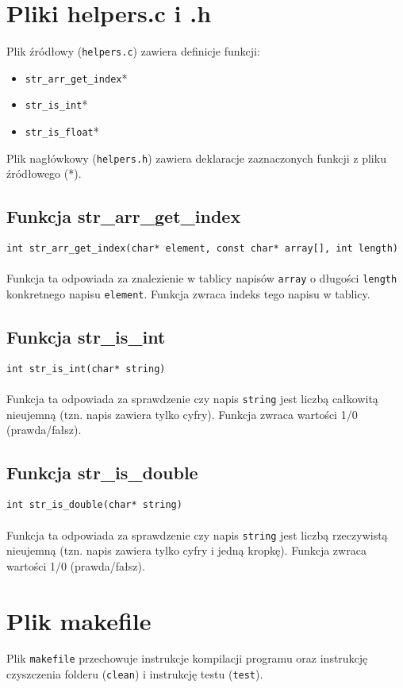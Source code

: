 \documentclass[11pt,a4paper]{report}
\begin{document}
    \section{Pliki helpers.c i .h}
    Plik źródłowy (\verb|helpers.c|) zawiera definicje funkcji:
    \begin{itemize}
        \item \verb|str_arr_get_index|*
        \item \verb|str_is_int|*
        \item \verb|str_is_float|*
    \end{itemize}
    Plik nagłówkowy (\verb|helpers.h|) zawiera deklaracje zaznaczonych funkcji z pliku źródłowego (*).\\
    \subsection{Funkcja str\_arr\_get\_index}
    \verb|int str_arr_get_index(char* element, const char* array[], int length)|\\
    \\
    Funkcja ta odpowiada za znalezienie w tablicy napisów \verb|array| o długości \verb|length| konkretnego napisu \verb|element|. Funkcja zwraca indeks tego napisu w tablicy.\\
    \subsection{Funkcja str\_is\_int}
    \verb|int str_is_int(char* string)|\\
    \\
    Funkcja ta odpowiada za sprawdzenie czy napis \verb|string| jest liczbą całkowitą nieujemną (tzn. napis zawiera tylko cyfry). Funkcja zwraca wartości 1/0 (prawda/fałsz).\\
    \subsection{Funkcja str\_is\_double}
    \verb|int str_is_double(char* string)|\\
    \\
    Funkcja ta odpowiada za sprawdzenie czy napis \verb|string| jest liczbą rzeczywistą nieujemną (tzn. napis zawiera tylko cyfry i jedną kropkę). Funkcja zwraca wartości 1/0 (prawda/fałsz).\\

    \newpage
    \section{Plik makefile}
    Plik \verb|makefile| przechowuje instrukcje kompilacji programu oraz instrukcję czyszczenia folderu (\verb|clean|) i instrukcję testu (\verb|test|).\\
\end{document}
